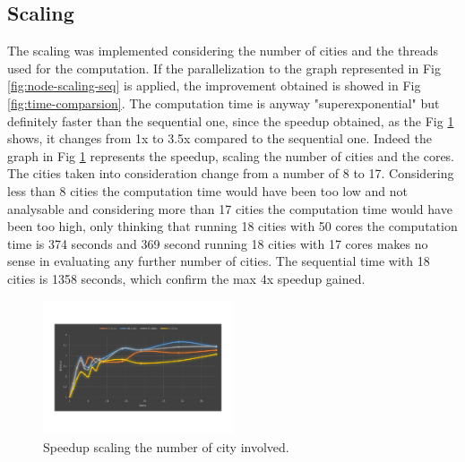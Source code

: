 \documentclass[11pt,conference]{IEEEtran}
\begin{document}
\subsection{Scaling}
The scaling was implemented considering the number of cities and the threads used for the computation.
\newline
If the parallelization to the graph represented in Fig \ref{fig:node-scaling-seq} is applied, the improvement obtained is showed in Fig \ref{fig:time-comparsion}. The computation time is anyway "superexponential" but definitely faster than the sequential one, since the speedup obtained, as the Fig \ref{fig:speedup-comparsion} shows, it changes from 1x to 3.5x compared to the sequential one. Indeed the graph in Fig \ref{fig:speedup-comparsion} represents the speedup, scaling the number of cities and the cores. The cities taken into consideration change from a number of 8 to 17. Considering less than 8 cities the computation time would have been too low and not analysable and considering more than 17 cities the computation time would have been too high, only thinking that running 18 cities with 50 cores the computation time is 374 seconds and 369 second running 18 cities with 17 cores makes no sense in evaluating any further number of cities. The sequential time with 18 cities is 1358 seconds, which confirm the max 4x speedup gained.

\begin{figure}[h!]
  \centering
    \includegraphics[width=0.5\textwidth]{speedup-comparsion}
    \caption{Speedup scaling the number of city involved.}
    \label{fig:speedup-comparsion}
\end{figure}
\end{document}
